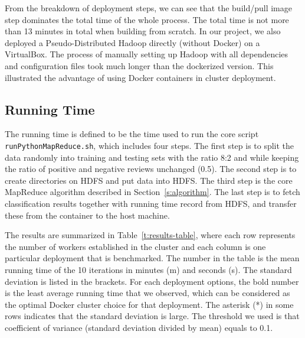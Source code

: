 From the breakdown of deployment steps, we can see that the build/pull
image step dominates the total time of the whole process. The total
time is not more than 13 minutes in total when building from
scratch. In our project, we also deployed a Pseudo-Distributed Hadoop
directly (without Docker) on a VirtualBox. The process of manually
setting up Hadoop with all dependencies and configuration files took
much longer than the dockerized version. This illustrated the
advantage of using Docker containers in cluster deployment.

\subsection{Running Time}

The running time is defined to be the time used to run the core script 
\verb|runPythonMapReduce.sh|, which includes four steps. The first step is 
to split the data randomly into training and testing sets with the
ratio 8:2 and while keeping the ratio of positive and negative reviews
unchanged (0.5). The second step is to create directories on HDFS and
put data into HDFS. The third step is the core MapReduce algorithm
described in Section~\ref{s:algorithm}. The last step is to fetch
classification results together with running time record from HDFS,
and transfer these from the container to the host machine.

The results are summarized in Table~\ref{t:results-table}, where each
row represents the number of workers established in the cluster and
each column is one particular deployment that is benchmarked. The
number in the table is the mean running time of the 10 iterations in
minutes (m) and seconds (s).  The standard deviation is listed in the
brackets. For each deployment options, the bold number is the least
average running time that we observed, which can be considered as the
optimal Docker cluster choice for that deployment. The asterisk (*) in
some rows indicates that the standard deviation is large. The
threshold we used is that coefficient of variance (standard deviation
divided by mean) equals to 0.1.

